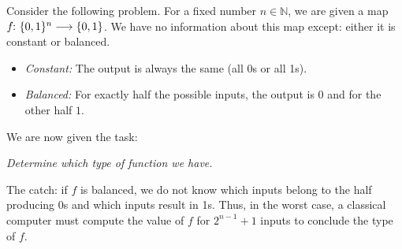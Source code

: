 \documentclass[a4paper, oneside, 12pt]{amsart}
\begin{document}
Consider the following problem.
For a fixed number \(n \in \mathbb{N}\), we are given a map \(f \from \{0,1\}^{n}\to\{0,1\}\).
We have no information about this map except: either it is constant or balanced.
\begin{itemize}
  \item \emph{Constant:} The output is always the same (all 0s or all 1s).
  \item \emph{Balanced:} For exactly half the possible inputs, the output is \(0\) and for the other half \(1\).
\end{itemize}
We are now given the task:
\medskip

\begin{center}
  \textit{Determine which type of function we have.}
\end{center}
\medskip

\noindent
The catch: if \(f\) is balanced, we do not know which inputs belong to the half producing 0s and which inputs result in 1s.
Thus, in the worst case, a classical computer must compute the value of \(f\) for \(2^{n-1} + 1\) inputs to conclude the type of \(f\).
\end{document}
